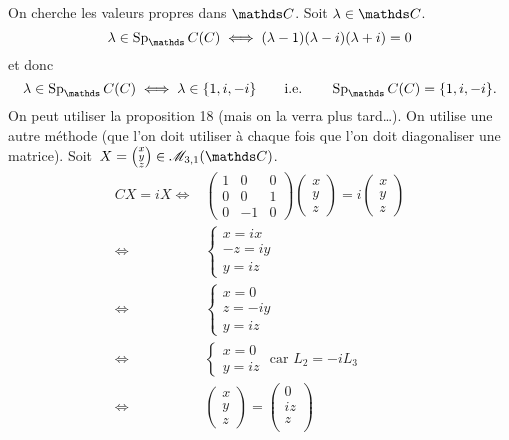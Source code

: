 \begin{exo}
\begin{enumerate}
			On cherche les valeurs propres dans $\C$. Soit $\lambda \in \C$. \[
				\lambda \in \Sp_\C(C) \iff (\lambda - 1)(\lambda - i) (\lambda + i)  = 0
			\] et donc \[
				\lambda \in \Sp_\C(C) \iff \lambda \in \{1,i,-i\} \qquad\text{i.e.}\qquad \Sp_\C(C) = \{1,i,-i\}
			.\]
			On peut utiliser la {\sc proposition}\/ 18 (mais on la verra plus tard\ldots). On utilise une autre méthode (que l'on doit utiliser à chaque fois que l'on doit diagonaliser une matrice).
			Soit~$X = \left( \substack{x\\y\\z} \right) \in \mathscr{M}_{3,1}(\C)$.
			\begin{align*}
				CX = i X \iff& \begin{pmatrix}
					1&0&0\\
					0&0&1\\
					0&-1&0
				\end{pmatrix} \begin{pmatrix}
					x\\y\\z
				\end{pmatrix} = i \begin{pmatrix}
					x\\y\\z
				\end{pmatrix}\\
				\iff& \begin{cases}
					x = i x\\
					-z = iy\\
					y = iz
				\end{cases}\\
				\iff&\begin{cases}
					x = 0\\
					z = -iy\\
					y = iz
				\end{cases}\\
				\iff& \begin{cases}
					x=0\\
					y = iz
				\end{cases} \text{ car } L_2 = -iL_3\\
				\iff& \begin{pmatrix}
					x\\y\\z
				\end{pmatrix} = \begin{pmatrix}
					0\\
					iz\\
					z\\

\end{pmatrix}
\end{align*}
\end{enumerate}
\end{exo}
